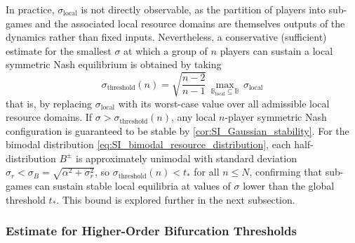 \documentclass{article}
\begin{document}
                In practice, $\sigma_{\mathrm{local}}$ is not directly observable, as the partition of players into sub-games and the associated local resource domains are themselves outputs of the dynamics rather than fixed inputs. Nevertheless, a conservative (sufficient) estimate for the smallest $\sigma$ at which a group of $n$ players can sustain a local symmetric Nash equilibrium is obtained by taking
                \begin{equation}
                    \sigma_{\mathrm{threshold}}(n) = \sqrt{\frac{n-2}{n-1}}\,
                    \max_{\mathbb{B}_{\mathrm{local}} \subseteq \mathbb{B}}\, 
                    \sigma_{\mathrm{local}}
                \end{equation}
                that is, by replacing $\sigma_{\mathrm{local}}$ with its worst-case value over all admissible local resource domains. If $\sigma > \sigma_{\mathrm{threshold}}(n)$, any local $n$-player symmetric Nash configuration is guaranteed to be stable by \cref{cor:SI_Gaussian_stability}. For the bimodal distribution \cref{eq:SI_bimodal_resource_distribution}, each half-distribution $B^\pm$ is approximately unimodal with standard deviation $\sigma_r < \sigma_B = \sqrt{\alpha^2 + \sigma_r^2}$, so $\sigma_{\mathrm{threshold}}(n) < t_*$ for all $n \leq N$, confirming that sub-games can sustain stable local equilibria at values of $\sigma$ lower than the global threshold $t_*$. This bound is explored further in the next subsection.

                \subsubsection{Estimate for Higher-Order Bifurcation Thresholds}\label{subsubsec:SI_exp_stability}
\end{document}
